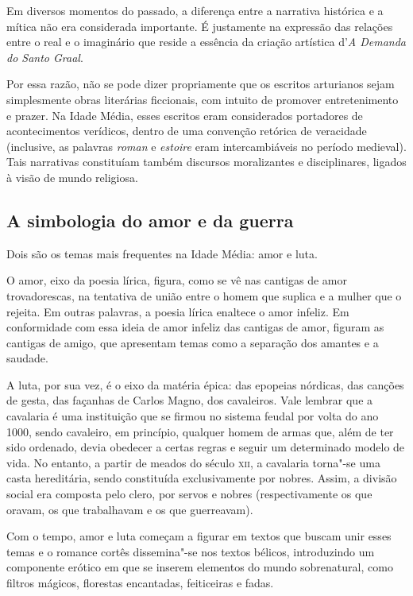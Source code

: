 \documentclass{extarticle}
\begin{document}
Em diversos momentos do passado, a diferença
entre a narrativa histórica e a mítica não era considerada importante. É
justamente na expressão das relações entre o real e o imaginário que
reside a essência da criação artística d'\emph{A Demanda do Santo
Graal}.

Por essa razão, não se pode dizer propriamente
que os escritos arturianos sejam simplesmente obras literárias
ficcionais, com intuito de promover entretenimento e prazer. Na Idade
Média, esses escritos eram considerados portadores de acontecimentos
verídicos, dentro de uma convenção retórica de veracidade (inclusive, as
palavras \emph{roman} e \emph{estoire} eram intercambiáveis no período
medieval). Tais narrativas constituíam também discursos moralizantes e
disciplinares, ligados à visão de mundo
religiosa.

\subsection{A simbologia do amor e da guerra}

Dois são os temas mais frequentes na Idade Média: amor e luta.

O amor, eixo da poesia lírica, figura, como se vê nas cantigas
de amor trovadorescas, na tentativa de união entre o homem que suplica e
a mulher que o rejeita. Em outras palavras, a poesia lírica enaltece o
amor infeliz. Em conformidade com essa ideia de amor infeliz das
cantigas de amor, figuram as cantigas de amigo, que apresentam temas
como a separação dos amantes e a
saudade.

A luta, por sua vez, é o eixo da matéria épica: das epopeias
nórdicas, das canções de gesta, das façanhas de Carlos Magno, dos
cavaleiros. Vale lembrar que a cavalaria é uma instituição que se firmou
no sistema feudal por volta do ano 1000, sendo cavaleiro, em princípio,
qualquer homem de armas que, além de ter sido ordenado, devia obedecer a
certas regras e seguir um determinado modelo de vida. No entanto, a
partir de meados do século \textsc{xii}, a cavalaria torna"-se uma casta
hereditária, sendo constituída exclusivamente por nobres. Assim, a
divisão social era composta pelo clero, por servos e nobres
(respectivamente os que oravam, os que trabalhavam e os que
guerreavam).

Com o tempo, amor e luta começam a figurar em textos que buscam
unir esses temas e o romance cortês dissemina"-se nos textos bélicos,
introduzindo um componente erótico em que se inserem elementos do mundo
sobrenatural, como filtros mágicos, florestas encantadas, feiticeiras e
fadas.
\end{document}
